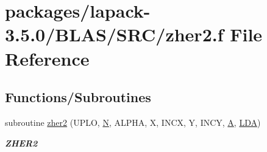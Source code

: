 \hypertarget{lapack-3_85_80_2BLAS_2SRC_2zher2_8f}{}\section{packages/lapack-\/3.5.0/\+B\+L\+A\+S/\+S\+R\+C/zher2.f File Reference}
\label{lapack-3_85_80_2BLAS_2SRC_2zher2_8f}
\subsection*{Functions/\+Subroutines}
\begin{DoxyCompactItemize}
\item 
subroutine \hyperlink{group__complex16__blas__level2_gac1d92c5939cc624b2fd9e832121a0fd4}{zher2} (U\+P\+L\+O, \hyperlink{polmisc_8c_a0240ac851181b84ac374872dc5434ee4}{N}, A\+L\+P\+H\+A, X, I\+N\+C\+X, Y, I\+N\+C\+Y, \hyperlink{classA}{A}, \hyperlink{example__user_8c_ae946da542ce0db94dced19b2ecefd1aa}{L\+D\+A})
\begin{DoxyCompactList}\small\item\em {\bfseries Z\+H\+E\+R2} \end{DoxyCompactList}\end{DoxyCompactItemize}
